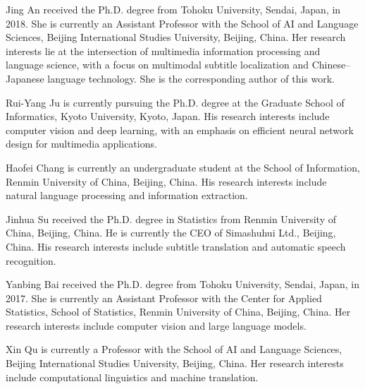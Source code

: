 \documentclass[journal]{IEEEtran}
\begin{document}
\begin{IEEEbiographynophoto}{Jing An}
received the Ph.D. degree from Tohoku University, Sendai, Japan, in 2018.
She is currently an Assistant Professor with the School of AI and Language Sciences, Beijing International Studies University, Beijing, China.
Her research interests lie at the intersection of multimedia information processing and language science, with a focus on multimodal subtitle localization and Chinese--Japanese language technology.
She is the corresponding author of this work.
\end{IEEEbiographynophoto}

\begin{IEEEbiographynophoto}{Rui-Yang Ju}
is currently pursuing the Ph.D. degree at the Graduate School of Informatics, Kyoto University, Kyoto, Japan.
His research interests include computer vision and deep learning, with an emphasis on efficient neural network design for multimedia applications.
\end{IEEEbiographynophoto}

\begin{IEEEbiographynophoto}{Haofei Chang}
is currently an undergraduate student at the School of Information, Renmin University of China, Beijing, China.
His research interests include natural language processing and information extraction.
\end{IEEEbiographynophoto}

\begin{IEEEbiographynophoto}{Jinhua Su}
received the Ph.D. degree in Statistics from Renmin University of China, Beijing, China.
He is currently the CEO of Simashuhui Ltd., Beijing, China.
His research interests include subtitle translation and automatic speech recognition.
\end{IEEEbiographynophoto}

\begin{IEEEbiographynophoto}{Yanbing Bai}
received the Ph.D. degree from Tohoku University, Sendai, Japan, in 2017.
She is currently an Assistant Professor with the Center for Applied Statistics, School of Statistics, Renmin University of China, Beijing, China.
Her research interests include computer vision and large language models.
\end{IEEEbiographynophoto}

\begin{IEEEbiographynophoto}{Xin Qu}
is currently a Professor with the School of AI and Language Sciences, Beijing International Studies University, Beijing, China.
Her research interests include computational linguistics and machine translation.
\end{IEEEbiographynophoto}
\end{document}
